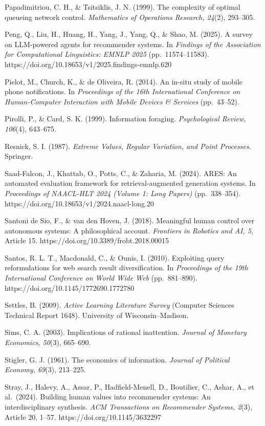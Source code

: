 \documentclass[
  11pt]{article}
\begin{document}
Papadimitriou, C. H., \& Tsitsiklis, J. N. (1999). The complexity of
optimal queueing network control. \emph{Mathematics of Operations
Research, 24}(2), 293--305.

Peng, Q., Liu, H., Huang, H., Yang, J., Yang, Q., \& Shao, M. (2025). A
survey on LLM-powered agents for recommender systems. In \emph{Findings
of the Association for Computational Linguistics: EMNLP 2025}
(pp.~11574--11583). https://doi.org/10.18653/v1/2025.findings-emnlp.620

Pielot, M., Church, K., \& de Oliveira, R. (2014). An in-situ study of
mobile phone notifications. In \emph{Proceedings of the 16th
International Conference on Human-Computer Interaction with Mobile
Devices \& Services} (pp.~43--52).

Pirolli, P., \& Card, S. K. (1999). Information foraging.
\emph{Psychological Review, 106}(4), 643--675.

Resnick, S. I. (1987). \emph{Extreme Values, Regular Variation, and
Point Processes}. Springer.

Saad-Falcon, J., Khattab, O., Potts, C., \& Zaharia, M. (2024). ARES: An
automated evaluation framework for retrieval-augmented generation
systems. In \emph{Proceedings of NAACL-HLT 2024 (Volume 1: Long Papers)}
(pp.~338--354). https://doi.org/10.18653/v1/2024.naacl-long.20

Santoni de Sio, F., \& van den Hoven, J. (2018). Meaningful human
control over autonomous systems: A philosophical account.
\emph{Frontiers in Robotics and AI, 5}, Article 15.
https://doi.org/10.3389/frobt.2018.00015

Santos, R. L. T., Macdonald, C., \& Ounis, I. (2010). Exploiting query
reformulations for web search result diversification. In
\emph{Proceedings of the 19th International Conference on World Wide
Web} (pp.~881--890). https://doi.org/10.1145/1772690.1772780

Settles, B. (2009). \emph{Active Learning Literature Survey} (Computer
Sciences Technical Report 1648). University of Wisconsin--Madison.

Sims, C. A. (2003). Implications of rational inattention. \emph{Journal
of Monetary Economics, 50}(3), 665--690.

Stigler, G. J. (1961). The economics of information. \emph{Journal of
Political Economy, 69}(3), 213--225.

Stray, J., Halevy, A., Assar, P., Hadfield-Menell, D., Boutilier, C.,
Ashar, A., et al.~(2024). Building human values into recommender
systems: An interdisciplinary synthesis. \emph{ACM Transactions on
Recommender Systems, 2}(3), Article 20, 1--57.
https://doi.org/10.1145/3632297
\end{document}
